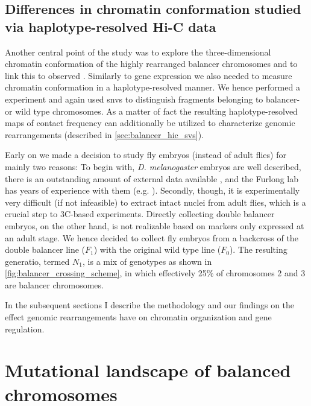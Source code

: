\subsection{Differences in chromatin conformation studied via haplotype-resolved Hi-C data}
\label{sec:balancer_study_design_hic}

Another central point of the study was to explore the three-dimensional
chromatin conformation of the highly rearranged balancer chromosomes and to link
this to observed \ase. Similarly to gene expression we also needed to measure
chromatin conformation in a haplotype-resolved manner. We hence performed a \hic
experiment and again used \acp{snv} to distinguish fragments belonging to
balancer- or wild type chromosomes. As a matter of fact the resulting
haplotype-resolved maps of contact frequency can additionally be utilized to
characterize genomic rearrangements (described in \cref{sec:balancer_hic_svs}).

Early on we made a decision to study fly embryos (instead of adult flies) for
mainly two reasons: To begin with, \textit{D. melanogaster} embryos are well
described, there is an outstanding amount of external data available
\citep{Gramates2017,Celniker2009}, and the Furlong lab has years of experience
with them (e.g. \cite{Furlong2001,Ghavi-Helm2014}). Secondly, though,
it is experimentally very difficult (if not infeasible) to extract intact
nuclei from adult flies, which is a crucial step to 3C-based experiments.
Directly collecting double balancer embryos, on the other hand, is not
realizable based on markers only expressed at an adult stage. We hence decided
to collect fly embryos from a backcross of the double balancer line ($F_1$) with
the original wild type line ($F_0$). The resulting generatio, termed $N_1$, is a
mix of genotypes as shown in \cref{fig:balancer_crossing_scheme}, in which
effectively 25\% of chromosomes 2 and 3 are balancer chromosomes.

In the subsequent sections I describe the methodology and our findings on the
effect genomic rearrangements have on chromatin organization and gene regulation.







\section{Mutational landscape of balanced chromosomes}
\label{sec:balancer_mutational_landscape}

